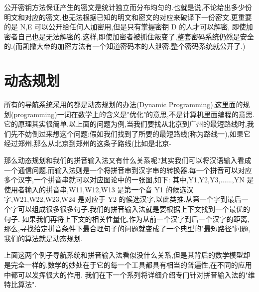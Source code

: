 \documentclass{article}
\begin{document}
公开密钥方法保证产生的密文是统计独立而分布均匀的.也就是说,不论给出多少份明文和对应的密文,也无法根据已知的明文和密文的对应来破译下一份密文.更重要的是 N,E 可以公开给任何人加密用,但是只有掌握密钥 D 的人才可以解密, 即使加密者自己也是无法解密的.这样,即使加密者被抓住叛变了,整套密码系统仍然是安全的.(而凯撒大帝的加密方法有一个知道密码本的人泄密,整个密码系统就公开了.)

\section{动态规划}
所有的导航系统采用的都是动态规划的办法(Dynamic Programming),这里面的规划(programming)一词在数学上的含义是"优化"的意思,不是计算机里面编程的意思.它的原理其实很简单.以上面的问题为例,当我们要找从北京到广州的最短路线时,我们先不妨倒过来想这个问题:假如我们找到了所要的最短路线(称为路线一),如果它经过郑州,那么从北京到郑州的这条子路线(比如是北京-

那么动态规划和我们的拼音输入法又有什么关系呢?其实我们可以将汉语输入看成一个通信问题,而输入法则是一个将拼音串到汉字串的转换器.每一个拼音可以对应多个汉字,一个拼音串就可以对应图论中的一张图,如下: 其中,Y1,Y2,Y3,......,YN 是使用者输入的拼音串,W11,W12,W13 是第一个音 Y1 的候选汉字,W21,W22,W23,W24 是对应于 Y2 的候选汉字,以此类推.从第一个字到最后一个字可以组成很多很多句子,我们的拼音输入法就是要根据上下文找到一个最优的句子.
如果我们再将上下文的相关性量化,作为从前一个汉字到后一个汉字的距离,那么,寻找给定拼音条件下最合理句子的问题就变成了一个典型的"最短路径"问题,我们的算法就是动态规划. 

上面这两个例子导航系统和拼音输入法看似没什么关系,但是其背后的数学模型却是完全一样的.数学的妙处在于它的每一个工具都具有相当的普遍性,在不同的应用中都可以发挥很大的作用. 我们在下一个系列将详细介绍专门针对拼音输入法的"维特比算法".
\end{document}
